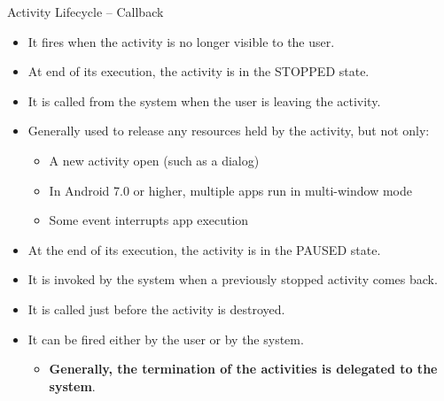 \documentclass{beamer}
\begin{document}
\begin{frame}[allowframebreaks]{Activity Lifecycle -- Callback}
  \begin{block}{}
    \begin{itemize}
      \item It fires when the activity is no longer visible to the user.
      \item At end of its execution, the activity is in the STOPPED state.
    \end{itemize}
  \end{block}

  \begin{block}{}
    \begin{itemize}
      \item It is called from the system when the user is leaving the activity.
      \item Generally used to release any resources held by the activity, but not only:
      \begin{itemize}
        \item A new activity open (such as a dialog)
        \item In Android 7.0 or higher, multiple apps run in multi-window mode
        \item Some event interrupts app execution
      \end{itemize}
      \item At the end of its execution, the activity is in the PAUSED state.
    \end{itemize}
  \end{block}

  \begin{block}{}
    \begin{itemize}
      \item It is invoked by the system when a previously stopped activity comes back.
    \end{itemize}
  \end{block}

  \begin{block}{}
    \begin{itemize}
      \item It is called just before the activity is destroyed.
      \item It can be fired either by the user or by the system.
      \begin{itemize}
        \item \textbf{Generally, the termination of the activities is delegated to the system}.
      \end{itemize}
    \end{itemize}
  \end{block}

\end{frame}
\end{document}
